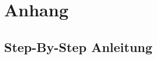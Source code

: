 \part{Anhang}
\begin{comment}
    Ausgedruckter Code, Sitzungsprotokolle, usw.: Vollständig aufführen und der Dokumentation beilegen.
    Listings von Scripten und Programmen. Die Eigenleistung der Kandidatin oder des Kandidaten muss vollständig dokumentiert sein. Automatisch generierten Code weglassen, wenn für das Verständnis nicht zwingend nötig.
    Falls Handbücher erstellt wurden, können diese hier als Anhang beigelegt werden.
    Firmenstandards zwingend in den Anhang!
\end{comment}

\chapter{Step-By-Step Anleitung}
